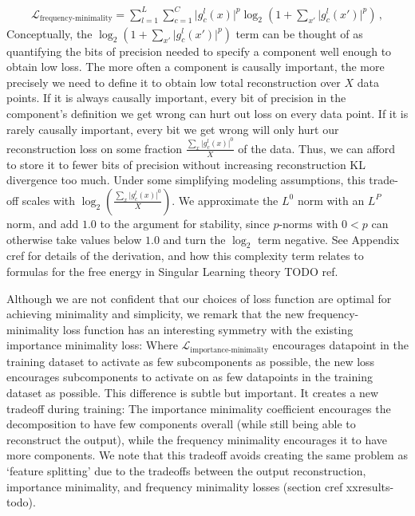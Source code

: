 \documentclass{article}
\begin{document}
\begin{equation}\label{eq:freq_minimality} 
\begin{aligned}
\mathcal{L}_{\text{frequency-minimality}}=\sum^L_{l=1}\sum^C_{c=1} \vert g^l_c(x) \vert^p\log_2(1+\sum_{x'} \vert g^l_c(x') \vert^p)\,,
\end{aligned}
\end{equation}
Conceptually, the $\log_2(1+\sum_{x'} \vert g^l_c(x') \vert^p)$ term can be thought of as quantifying the bits of precision needed to specify a component well enough to obtain low loss. The more often a component is causally important, the more precisely we need to define it to obtain low total reconstruction over $X$ data points. If it is always causally important, every bit of precision in the component's definition we get wrong can hurt out loss on every data point. If it is rarely causally important, every bit we get wrong will only hurt our reconstruction loss on some fraction $\frac{\sum_{x} \vert g^l_c(x)\vert^0}{X}$ of the data. Thus, we can afford to store it to fewer bits of precision without increasing reconstruction KL divergence too much. Under some simplifying modeling assumptions, this trade-off scales with $\log_2(\frac{\sum_{x} \vert g^l_c(x)\vert^0}{X})$. We approximate the $L^0$ norm with an $L^P$ norm, and add $1.0$ to the argument for stability, since $p$-norms with $0<p$ can otherwise take values below $1.0$ and turn the $\log_2$ term negative. See Appendix cref for details of the derivation, and how this complexity term relates to formulas for the free energy in Singular Learning theory TODO ref. 



Although we are not confident that our choices of loss function are optimal for achieving minimality and simplicity, we remark that the new frequency-minimality loss function has an interesting symmetry with the existing importance minimality loss: Where $\mathcal{L}_{\text{importance-minimality}}$ encourages datapoint in the training dataset to activate as few subcomponents as possible, the new loss encourages subcomponents to activate on as few datapoints in the training dataset as possible. This difference is subtle but important. It creates a new tradeoff during training: The importance minimality coefficient encourages the decomposition to have few components overall (while still being able to reconstruct the output), while the frequency minimality encourages it to have more components. We note that this tradeoff avoids creating the same problem as `feature splitting' due to the tradeoffs between the output reconstruction, importance minimality, and frequency minimality losses (section cref xxresults-todo).
\end{document}
